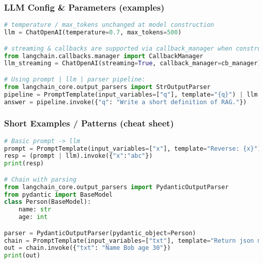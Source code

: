 \begin{frame}[fragile]\frametitle{LLM Config \& Parameters (examples)}
\begin{lstlisting}[language=python,basicstyle=\tiny]
# temperature / max_tokens unchanged at model construction
llm = ChatOpenAI(temperature=0.7, max_tokens=500)

# streaming & callbacks are supported via callback_manager when constructing the model
from langchain.callbacks.manager import CallbackManager
llm_streaming = ChatOpenAI(streaming=True, callback_manager=cb_manager)

# Using prompt | llm | parser pipeline:
from langchain_core.output_parsers import StrOutputParser
pipeline = PromptTemplate(input_variables=["q"], template="{q}") | llm | StrOutputParser()
answer = pipeline.invoke({"q": "Write a short definition of RAG."})
\end{lstlisting}
\end{frame}

\begin{frame}[fragile]\frametitle{Short Examples / Patterns (cheat sheet)}
\begin{lstlisting}[language=python,basicstyle=\tiny]
# Basic prompt -> llm
prompt = PromptTemplate(input_variables=["x"], template="Reverse: {x}")
resp = (prompt | llm).invoke({"x":"abc"})
print(resp)

# Chain with parsing
from langchain_core.output_parsers import PydanticOutputParser
from pydantic import BaseModel
class Person(BaseModel):
    name: str
    age: int

parser = PydanticOutputParser(pydantic_object=Person)
chain = PromptTemplate(input_variables=["txt"], template="Return json matching Person for: {txt}") | llm | parser
out = chain.invoke({"txt": "Name Bob age 30"})
print(out)
\end{lstlisting}
\end{frame}
